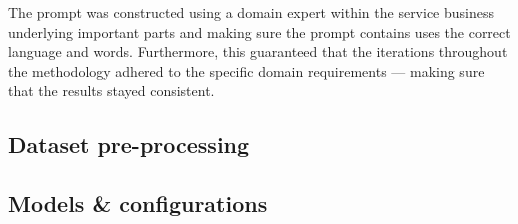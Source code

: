 The prompt was constructed using a domain expert within the service business underlying important parts and making sure the prompt contains uses the correct language and words. Furthermore, this guaranteed that the iterations throughout the methodology adhered to the specific domain requirements --- making sure that the results stayed consistent.


%

\subsection{Dataset pre-processing}
%

\subsection{Models \& configurations}
%
%
%

